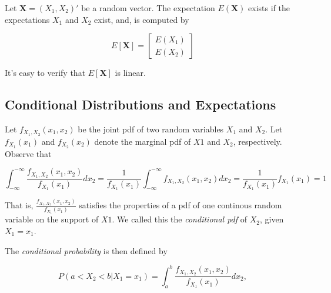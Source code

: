 \documentclass{article}
\begin{document}
                Let $ \mathbf{X} = (X_{1}, X_{2})' $ be a random vector. The
                expectation $ E( \mathbf{X} ) $ exists if the expectations $
                X_{1} $ and $ X_{2} $ exist, and, is computed by

                \begin{equation*}
                    E[ \mathbf{X} ] = \left[ \begin{array}{l}
                            E( X_{1} ) \\
                            E( X_{2} )
                    \end{array} \right]
                \end{equation*}

                It's easy to verify that $ E[ \mathbf{X} ] $ is linear.

            \subsection{Conditional Distributions and Expectations}

                Let $ f_{X_{1}, X_{2}}(x_{1}, x_{2}) $ be the joint pdf of two
                random variables $ X_{1} $ and $ X_{2} $. Let $
                f_{X_{1}}(x_{1}) $ and $ f_{X_{2}}(x_{2}) $ denote the marginal
                pdf of $ X1 $ and $ X_{2} $, respectively. Observe that

                \begin{equation*}
                     \int_{ -\infty }^{ -\infty } \frac{ f_{X_{1}, X_{2}}(x_{1}, x_{2}) }{ f_{X_{1}}( x_{1}) } d x_{2}
                        = \frac{1}{ f_{X_{1}}(x_{1}) } \int_{ -\infty }^{ -\infty } f_{X_{1}, X_{2}}(x_{1}, x_{2}) d x_{2}
                        = \frac{1}{ f_{X_{1}}(x_{1}) } f_{X_{1}}(x_{1}) = 1
                \end{equation*}

                That is, $ \frac{ f_{X_{1}, X_{2}}(x_{1}, x_{2}) }{ f_{X_{1}}(
                x_{1}) } $ satisfies the properties of a pdf of one continous
                random variable on the support of $ X1 $. We called this the
                \textit{conditional pdf} of $ X_{2} $, given $ X_{1} = x_{1} $.

                The \textit{conditional probability} is then defined by

                \begin{equation*}
                     P( a < X_{2} < b | X_{1} = x_{1}) = \int_{a}^{b} \frac{
                     f_{X_{1}, X_{2}}(x_{1}, x_{2}) }{ f_{X_{1}}( x_{1}) } d x_{2},
                \end{equation*}
\end{document}
